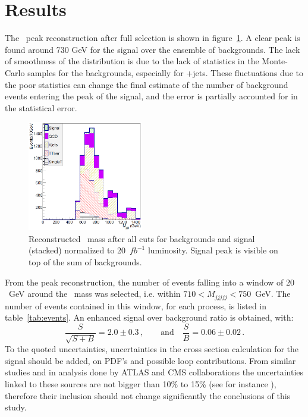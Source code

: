 \section{Results}
\label{sec:Pres}

The \Tp~peak reconstruction after full selection is shown in figure~\ref{fig:M5J}. A clear peak is found around 730 GeV for the signal over the ensemble of backgrounds. 
The lack of smoothness of the distribution is due to the lack of statistics in the Monte-Carlo samples for the  backgrounds, especially for \W+jets. These fluctuations due to the poor statistics can change the final estimate of the number of background events entering the peak of the signal, and the error is partially accounted for in the statistical error. 

\begin{figure}[!Hhtbp]
  \begin{center}
    \includegraphics[width=0.45\textwidth]{figs/Pheno/Final.png}
    \caption{Reconstructed \Tp~mass after all cuts for backgrounds and signal (stacked) normalized to 20~$fb^{-1}$ luminosity. Signal peak is visible on top of the sum of backgrounds.}
    \label{fig:M5J}
  \end{center}
\end{figure}

From the peak reconstruction, the number of events falling into a window of $20$~GeV around the \Tp~mass was selected, i.e. within $710 < M_{jjjjj} < 750$~GeV. The number of events contained in this window, for each process, is listed in table~\ref{tab:events}. An enhanced signal over background ratio is obtained, with:
\begin{equation}
\frac{S}{\sqrt{S+B}}=2.0\pm 0.3\,, \qquad \mbox{and} \quad \frac{S}{B}=0.06\pm 0.02\,. 
\end{equation}
To the quoted uncertainties, uncertainties in the cross section calculation for the signal should be added, on PDF's and possible loop contributions. From similar studies and in analysis done by ATLAS and CMS collaborations the uncertainties linked to these sources are not bigger than 10\% to 15\% (see for instance \cite{Aad:2011yn}), therefore their inclusion should not change significantly the conclusions of this study.

